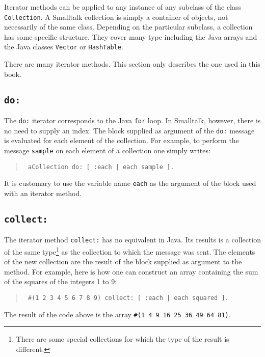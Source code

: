 \documentclass[twoside]{book}
\begin{document}
Iterator methods can be applied to any instance of any subclass of
the class {\tt Collection}. A Smalltalk collection is simply a
container of objects, not necessarily of the same class. Depending
on the particular subclass, a collection has some specific
structure. They cover many type including the Java arrays and the
Java classes {\tt Vector} or {\tt HashTable}.

There are many iterator methods. This section only describes the
one used in this book.

\subsection{\tt do:}
The {\tt do:} iterator corresponds to the Java {\tt for} loop. In
Smalltalk, however, there is no need to supply an index. The block
 supplied as argument of the {\tt do:} message is evaluated
for each element of the collection. For example, to perform the
message {\tt sample} on each element of a collection one simply
writes:
\begin{quote}
\begin{verbatim}
 aCollection do: [ :each | each sample ].
\end{verbatim}
\end{quote}
It is customary to use the variable name {\tt each} as the
argument of the block used with an iterator method.

\subsection{\tt collect:}
\label{sec:collect} The iterator method {\tt collect:} has no
equivalent in Java. Its results is a collection of the same
type\footnote{There are some special collections for which the
type of the result is different.} as the collection to which the
message was sent. The elements of the new collection are the
result of the block supplied as argument to the method.
For example, here is how one can construct an array containing the
sum of the squares of the integers 1 to 9:
\begin{quote}
\begin{verbatim}
 #(1 2 3 4 5 6 7 8 9) collect: [ :each | each squared ].
\end{verbatim}
\end{quote}
The result of the code above is the array {\tt \#(1 4 9 16 25 36
49 64 81)}.
\end{document}
